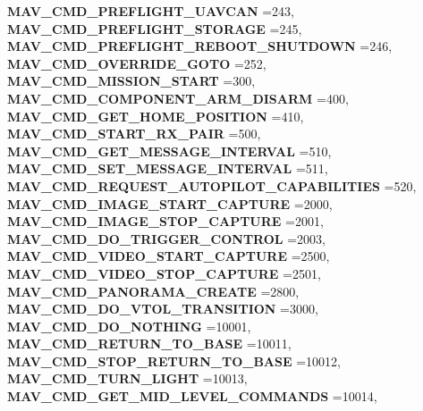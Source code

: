 \begin{DoxyCompactItemize}
\textbf{ M\+A\+V\+\_\+\+C\+M\+D\+\_\+\+P\+R\+E\+F\+L\+I\+G\+H\+T\+\_\+\+U\+A\+V\+C\+AN} =243, 
\textbf{ M\+A\+V\+\_\+\+C\+M\+D\+\_\+\+P\+R\+E\+F\+L\+I\+G\+H\+T\+\_\+\+S\+T\+O\+R\+A\+GE} =245, 
\textbf{ M\+A\+V\+\_\+\+C\+M\+D\+\_\+\+P\+R\+E\+F\+L\+I\+G\+H\+T\+\_\+\+R\+E\+B\+O\+O\+T\+\_\+\+S\+H\+U\+T\+D\+O\+WN} =246, 
\newline
\textbf{ M\+A\+V\+\_\+\+C\+M\+D\+\_\+\+O\+V\+E\+R\+R\+I\+D\+E\+\_\+\+G\+O\+TO} =252, 
\textbf{ M\+A\+V\+\_\+\+C\+M\+D\+\_\+\+M\+I\+S\+S\+I\+O\+N\+\_\+\+S\+T\+A\+RT} =300, 
\textbf{ M\+A\+V\+\_\+\+C\+M\+D\+\_\+\+C\+O\+M\+P\+O\+N\+E\+N\+T\+\_\+\+A\+R\+M\+\_\+\+D\+I\+S\+A\+RM} =400, 
\textbf{ M\+A\+V\+\_\+\+C\+M\+D\+\_\+\+G\+E\+T\+\_\+\+H\+O\+M\+E\+\_\+\+P\+O\+S\+I\+T\+I\+ON} =410, 
\newline
\textbf{ M\+A\+V\+\_\+\+C\+M\+D\+\_\+\+S\+T\+A\+R\+T\+\_\+\+R\+X\+\_\+\+P\+A\+IR} =500, 
\textbf{ M\+A\+V\+\_\+\+C\+M\+D\+\_\+\+G\+E\+T\+\_\+\+M\+E\+S\+S\+A\+G\+E\+\_\+\+I\+N\+T\+E\+R\+V\+AL} =510, 
\textbf{ M\+A\+V\+\_\+\+C\+M\+D\+\_\+\+S\+E\+T\+\_\+\+M\+E\+S\+S\+A\+G\+E\+\_\+\+I\+N\+T\+E\+R\+V\+AL} =511, 
\textbf{ M\+A\+V\+\_\+\+C\+M\+D\+\_\+\+R\+E\+Q\+U\+E\+S\+T\+\_\+\+A\+U\+T\+O\+P\+I\+L\+O\+T\+\_\+\+C\+A\+P\+A\+B\+I\+L\+I\+T\+I\+ES} =520, 
\newline
\textbf{ M\+A\+V\+\_\+\+C\+M\+D\+\_\+\+I\+M\+A\+G\+E\+\_\+\+S\+T\+A\+R\+T\+\_\+\+C\+A\+P\+T\+U\+RE} =2000, 
\textbf{ M\+A\+V\+\_\+\+C\+M\+D\+\_\+\+I\+M\+A\+G\+E\+\_\+\+S\+T\+O\+P\+\_\+\+C\+A\+P\+T\+U\+RE} =2001, 
\textbf{ M\+A\+V\+\_\+\+C\+M\+D\+\_\+\+D\+O\+\_\+\+T\+R\+I\+G\+G\+E\+R\+\_\+\+C\+O\+N\+T\+R\+OL} =2003, 
\textbf{ M\+A\+V\+\_\+\+C\+M\+D\+\_\+\+V\+I\+D\+E\+O\+\_\+\+S\+T\+A\+R\+T\+\_\+\+C\+A\+P\+T\+U\+RE} =2500, 
\newline
\textbf{ M\+A\+V\+\_\+\+C\+M\+D\+\_\+\+V\+I\+D\+E\+O\+\_\+\+S\+T\+O\+P\+\_\+\+C\+A\+P\+T\+U\+RE} =2501, 
\textbf{ M\+A\+V\+\_\+\+C\+M\+D\+\_\+\+P\+A\+N\+O\+R\+A\+M\+A\+\_\+\+C\+R\+E\+A\+TE} =2800, 
\textbf{ M\+A\+V\+\_\+\+C\+M\+D\+\_\+\+D\+O\+\_\+\+V\+T\+O\+L\+\_\+\+T\+R\+A\+N\+S\+I\+T\+I\+ON} =3000, 
\textbf{ M\+A\+V\+\_\+\+C\+M\+D\+\_\+\+D\+O\+\_\+\+N\+O\+T\+H\+I\+NG} =10001, 
\newline
\textbf{ M\+A\+V\+\_\+\+C\+M\+D\+\_\+\+R\+E\+T\+U\+R\+N\+\_\+\+T\+O\+\_\+\+B\+A\+SE} =10011, 
\textbf{ M\+A\+V\+\_\+\+C\+M\+D\+\_\+\+S\+T\+O\+P\+\_\+\+R\+E\+T\+U\+R\+N\+\_\+\+T\+O\+\_\+\+B\+A\+SE} =10012, 
\textbf{ M\+A\+V\+\_\+\+C\+M\+D\+\_\+\+T\+U\+R\+N\+\_\+\+L\+I\+G\+HT} =10013, 
\textbf{ M\+A\+V\+\_\+\+C\+M\+D\+\_\+\+G\+E\+T\+\_\+\+M\+I\+D\+\_\+\+L\+E\+V\+E\+L\+\_\+\+C\+O\+M\+M\+A\+N\+DS} =10014, 

\end{DoxyCompactItemize}
